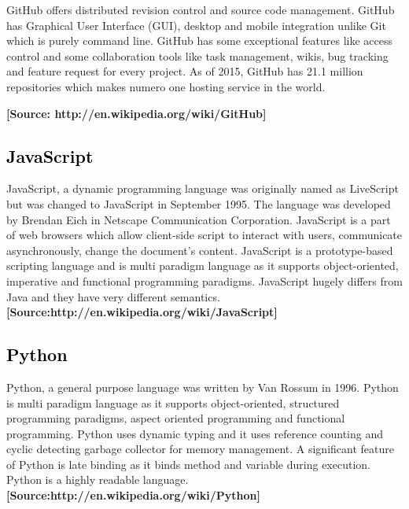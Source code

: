 \documentclass{article}\usepackage[]{graphicx}\usepackage[]{color}
\begin{document}
GitHub offers distributed revision control and source code management. GitHub has Graphical User Interface (GUI), desktop and mobile integration unlike Git which is purely command line. GitHub has some exceptional features like access control and some collaboration tools like task management, wikis, bug tracking and feature request for every project. As of 2015, GitHub has 21.1 million repositories which makes numero one hosting service in the world.                             {\newline\textbf{[Source: http://en.wikipedia.org/wiki/GitHub]}

\subsection*{\Large\textcolor{black}{JavaScript}}
JavaScript, a dynamic programming language was originally named as LiveScript but was changed to JavaScript in September 1995. The language was developed by Brendan Eich in Netscape Communication Corporation.  JavaScript is a part of  web browsers which allow client-side script to interact with users, communicate asynchronously, change the document’s content. JavaScript is a prototype-based scripting language and is multi paradigm language as it supports object-oriented, imperative and functional programming paradigms.  JavaScript hugely differs from Java and they have very different semantics. {\newline\textbf{[Source:http://en.wikipedia.org/wiki/JavaScript]}}   

\subsection*{\Large\textcolor{black}{Python}}
   Python, a general purpose language was written by Van Rossum in 1996. Python is multi paradigm language as it supports object-oriented, structured programming paradigms, aspect oriented programming and functional programming. Python uses dynamic typing and it uses reference counting and cyclic detecting garbage collector for memory management. A significant feature of Python is late binding as it binds method and variable during execution. Python is a highly readable language. {\newline\textbf{[Source:http://en.wikipedia.org/wiki/Python]}}                                                                                             

}
\end{document}
